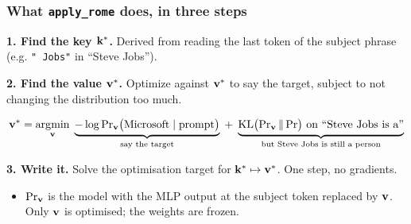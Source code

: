 \begin{frame}
\frametitle{What \texttt{apply\_rome} does, in three steps}
\textbf{1. Find the key $\mathbf{k}^*$.} Derived from 
reading the last token of the subject phrase (e.g. \texttt{" Jobs"} in ``Steve Jobs'').

\vspace{0.15cm}
\textbf{2. Find the value $\mathbf{v}^*$.}
Optimize against $\mathbf{v}^*$ to say the target, subject to not changing the distribution
too much.
\begin{block}{}
\vspace{-0.2cm}
$$
\mathbf{v}^* = \operatorname*{\arg\!\min}_{\mathbf{v}}\;
\underbrace{-\log \text{Pr}_{\mathbf{v}}\big(\text{Microsoft} \mid \text{prompt}\big)}_{\text{say the target}}
\;+\;
\underbrace{\mathrm{KL}\big(\text{Pr}_{\mathbf{v}} \,\Vert\, \text{Pr}\big) \text{ on ``Steve Jobs is a''}}_{\text{but Steve Jobs is still a person}}
$$
\vspace{-0.3cm}
\end{block}
\textbf{3. Write it.} Solve the optimisation target for $\mathbf{k}^* \mapsto \mathbf{v}^*$. One step, no gradients.
\begin{itemize}
    \item $\text{Pr}_{\mathbf{v}}$ is the model with the MLP output at the subject token
    replaced by $\mathbf{v}$. Only $\mathbf{v}$ is optimised; the weights are frozen.
\end{itemize}
\end{frame}

